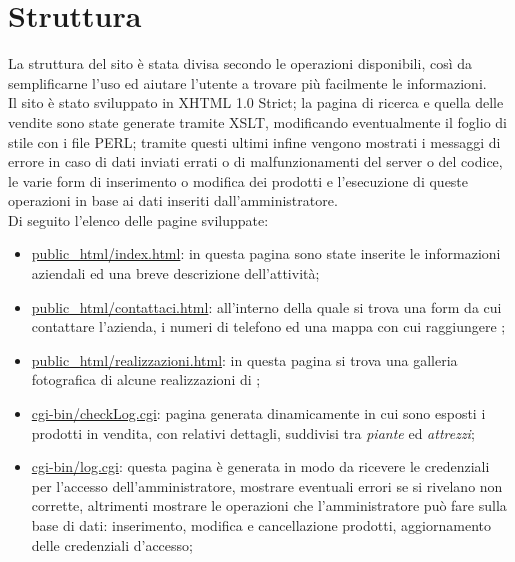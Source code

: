 \section{Struttura}{
	La struttura del sito è stata divisa secondo le operazioni disponibili, così da semplificarne l'uso ed aiutare l'utente a trovare più facilmente le informazioni.
	\\
	Il sito è stato sviluppato in XHTML 1.0 Strict; la pagina di ricerca e quella delle vendite sono state generate tramite XSLT, modificando eventualmente il foglio di stile con i file PERL; tramite questi ultimi infine vengono mostrati i messaggi di errore in caso di dati inviati errati o di malfunzionamenti del server o del codice, le varie form di inserimento o modifica dei prodotti e l'esecuzione di queste operazioni in base ai dati inseriti dall'amministratore.
	\\
	Di seguito l'elenco delle pagine sviluppate:
	\begin{itemize}\itemsep1pt
		\item \href{http://tecnologie-web.studenti.math.unipd.it/tecweb/~pgabelli/}{public\_html/index.html}: in questa pagina sono state inserite le informazioni aziendali ed una breve descrizione dell'attività;
		\item \href{http://tecnologie-web.studenti.math.unipd.it/tecweb/~pgabelli/contattaci.html}{public\_html/contattaci.html}: all'interno della quale si trova una form da cui contattare l'azienda, i numeri di telefono ed una mappa con cui raggiungere \textbf{\ggt};
		\item \href{http://tecnologie-web.studenti.math.unipd.it/tecweb/~pgabelli/realizzazioni.html}{public\_html/realizzazioni.html}: in questa pagina si trova una galleria fotografica di alcune realizzazioni di \textbf{\ggt};
		\item \href{http://tecnologie-web.studenti.math.unipd.it/tecweb/~pgabelli/cgi-bin/checkLog.cgi}{cgi-bin/checkLog.cgi}: pagina generata dinamicamente in cui sono esposti i prodotti in vendita, con relativi dettagli, suddivisi tra \textit{piante} ed \textit{attrezzi};
		\item \href{http://tecnologie-web.studenti.math.unipd.it/tecweb/~pgabelli/cgi-bin/log.cgi}{cgi-bin/log.cgi}: questa pagina è generata in modo da ricevere le credenziali per l'accesso dell'amministratore, mostrare eventuali errori se si rivelano non corrette, altrimenti mostrare le operazioni che l'amministratore può fare sulla base di dati: inserimento, modifica e cancellazione prodotti, aggiornamento delle credenziali d'accesso;

\end{itemize}}
